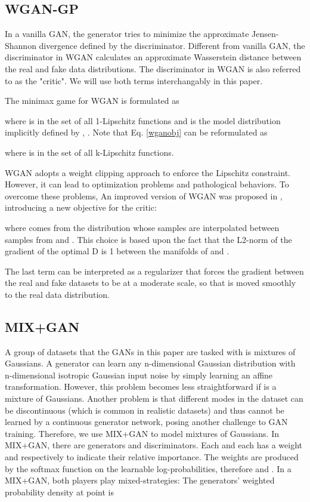 \documentclass[conference]{IEEEtran}
\begin{document}
\subsection{WGAN-GP}
In a vanilla GAN, the generator tries to minimize the approximate Jensen-Shannon divergence defined by the discriminator. Different from vanilla GAN, the discriminator in WGAN calculates an approximate Wasserstein distance between the real and fake data distributions. The discriminator in WGAN is also referred to as the "critic". We will use both terms interchangably in this paper.  

The minimax game for WGAN is formulated as

where  is in the set of all 1-Lipschitz functions and  is the model distribution implicitly defined by  , . Note that Eq. \ref{wganobj} can be reformulated as

where  is in the set of all k-Lipschitz functions.

WGAN  \cite{wgan} adopts a weight clipping approach to enforce the Lipschitz constraint. However, it can lead to optimization problems and pathological behaviors. To overcome these problems, An improved version of WGAN was proposed in \cite{improvedwgan}, introducing a new objective for the critic:

where  comes from the distribution  whose samples are interpolated between samples from  and . This choice is based upon the fact that the L2-norm of the gradient of the optimal D is 1 between the manifolds of  and  \cite{improvedwgan}.



The last term can be interpreted as a regularizer that forces the gradient between the real and fake datasets to be at a moderate scale, so that  is moved smoothly to the real data distribution.

\subsection{MIX+GAN}
A group of datasets that the GANs in this paper are tasked with is mixtures of Gaussians. A generator can learn any n-dimensional Gaussian distribution with n-dimensional isotropic Gaussian input noise by simply learning an affine transformation. However, this problem becomes less straightforward if  is a mixture of Gaussians. Another problem is that different modes in the dataset can be discontinuous (which is common in realistic datasets) and thus cannot be learned by a continuous generator network, posing another challenge to GAN training. Therefore, we use MIX+GAN \cite{generalization} to model mixtures of Gaussians. In MIX+GAN, there are  generators and  discriminators. Each  and each  has a weight  and  respectively to indicate their relative importance. The weights are produced by the softmax function on the learnable log-probabilities, therefore  and .
In a MIX+GAN, both players play mixed-strategies: The generators' weighted probability density at point  is
\end{document}
